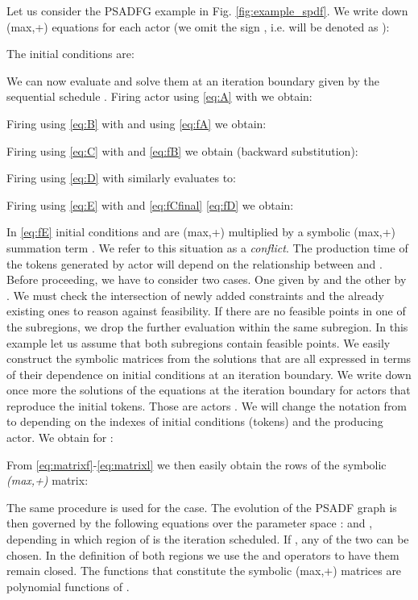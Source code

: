 \documentclass[]{eptcs}
\begin{document}
Let us consider the PSADFG example in Fig. \ref{fig:example_spdf}.
We write down (max,+) equations for each actor (we omit the sign , i.e.  will be denoted as ):





The initial conditions are:

We can now evaluate and solve them at an iteration boundary given by the sequential schedule .
Firing actor  using \eqref{eq:A} with  we obtain:

Firing  using \eqref{eq:B} with  and using \eqref{eq:fA} we obtain:

Firing  using \eqref{eq:C} with  and \eqref{eq:fB} we obtain (backward substitution):

Firing  using \eqref{eq:D} with  similarly evaluates to:

Firing  using \eqref{eq:E} with  and \eqref{eq:fCfinal} \eqref{eq:fD} we obtain:

In \eqref{eq:fE} initial conditions  and  are (max,+) multiplied by a symbolic (max,+) summation term . We refer to this situation as a \textit{conflict}. The production time of the tokens generated by actor  will depend on the relationship between  and . Before proceeding, we have to consider two cases. One given by  and the other by . We must check the intersection of newly added constraints and the already existing ones to reason against feasibility. If there are no feasible points in one of the subregions, we drop the further evaluation within the same subregion. In this example let us assume that both subregions contain feasible points. We easily construct the symbolic matrices from the solutions that are all expressed in terms of their dependence on initial conditions at an iteration boundary.
We write down once more the solutions of the equations at the iteration boundary for actors that reproduce the initial tokens. Those are actors . We will change the notation from  to  depending on the indexes of initial conditions (tokens) and the producing actor. We obtain for :

From \eqref{eq:matrixf}-\eqref{eq:matrixl} we then easily obtain the rows of the symbolic \textit{(max,+)} matrix:

The same procedure is used for the   case.
The evolution of the PSADF graph is then governed by the following equations over the parameter space :  and , depending in which region of  is the  iteration scheduled. If , any of the two can be chosen. In the definition of both regions we use the  and  operators to have them remain closed. The functions that constitute the symbolic (max,+) matrices are polynomial functions of .
\end{document}
